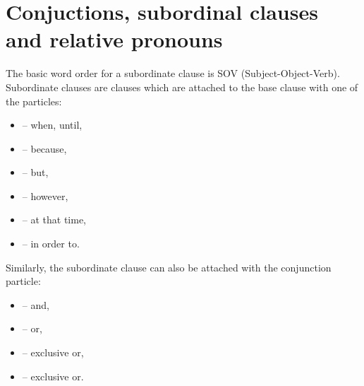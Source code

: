 




\section{Conjuctions, subordinal clauses and relative pronouns}
\label{sec:conjunctions}

The basic word order for a subordinate clause is SOV (Subject-Object-Verb).
Subordinate clauses are clauses which are attached to the base clause with one
of the particles:

\begin{itemize}
    \item {} -- when, until,
    \item {} -- because,
    \item {} -- but,
    \item {} -- however,
    \item {} -- at that time,
    \item {} -- in order to.
\end{itemize}

Similarly, the subordinate clause can also be attached with the conjunction
particle:

\begin{itemize}
    \item {} -- and,
    \item {} -- or,
    \item {} -- exclusive or,
    \item {} -- exclusive or.
\end{itemize}

